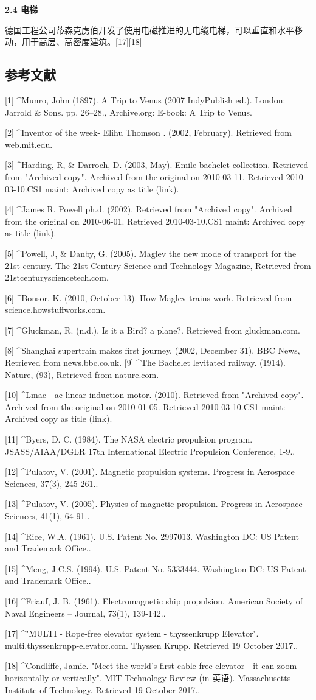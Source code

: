 \textbf{2.4 电梯}

德国工程公司蒂森克虏伯开发了使用电磁推进的无电缆电梯，可以垂直和水平移动，用于高层、高密度建筑。[17][18]
\subsection{参考文献}
[1]
^Munro, John (1897). A Trip to Venus (2007 IndyPublish ed.). London: Jarrold & Sons. pp. 26–28., Archive.org: E-book: A Trip to Venus.

[2]
^Inventor of the week- Elihu Thomson . (2002, February). Retrieved from web.mit.edu.

[3]
^Harding, R, & Darroch, D. (2003, May). Emile bachelet collection. Retrieved from "Archived copy". Archived from the original on 2010-03-11. Retrieved 2010-03-10.CS1 maint: Archived copy as title (link).

[4]
^James R. Powell ph.d. (2002). Retrieved from "Archived copy". Archived from the original on 2010-06-01. Retrieved 2010-03-10.CS1 maint: Archived copy as title (link).

[5]
^Powell, J, & Danby, G. (2005). Maglev the new mode of transport for the 21st century. The 21st Century Science and Technology Magazine, Retrieved from 21stcenturysciencetech.com.

[6]
^Bonsor, K. (2010, October 13). How Maglev trains work. Retrieved from science.howstuffworks.com.

[7]
^Gluckman, R. (n.d.). Is it a Bird? a plane?. Retrieved from gluckman.com.

[8]
^Shanghai supertrain makes first journey. (2002, December 31). BBC News, Retrieved from news.bbc.co.uk.
[9]
^The Bachelet levitated railway. (1914). Nature, (93), Retrieved from nature.com.

[10]
^Lmac - ac linear induction motor. (2010). Retrieved from "Archived copy". Archived from the original on 2010-01-05. Retrieved 2010-03-10.CS1 maint: Archived copy as title (link).

[11]
^Byers, D. C. (1984). The NASA electric propulsion program. JSASS/AIAA/DGLR 17th International Electric Propulsion Conference, 1-9..

[12]
^Pulatov, V. (2001). Magnetic propulsion systems. Progress in Aerospace Sciences, 37(3), 245-261..

[13]
^Pulatov, V. (2005). Physics of magnetic propulsion. Progress in Aerospace Sciences, 41(1), 64-91..

[14]
^Rice, W.A. (1961). U.S. Patent No. 2997013. Washington DC: US Patent and Trademark Office..

[15]
^Meng, J.C.S. (1994). U.S. Patent No. 5333444. Washington DC: US Patent and Trademark Office..

[16]
^Friauf, J. B. (1961). Electromagnetic ship propulsion. American Society of Naval Engineers -- Journal, 73(1), 139-142..

[17]
^"MULTI - Rope-free elevator system - thyssenkrupp Elevator". multi.thyssenkrupp-elevator.com. Thyssen Krupp. Retrieved 19 October 2017..

[18]
^Condliffe, Jamie. "Meet the world's first cable-free elevator—it can zoom horizontally or vertically". MIT Technology Review (in 英语). Massachusetts Institute of Technology. Retrieved 19 October 2017..